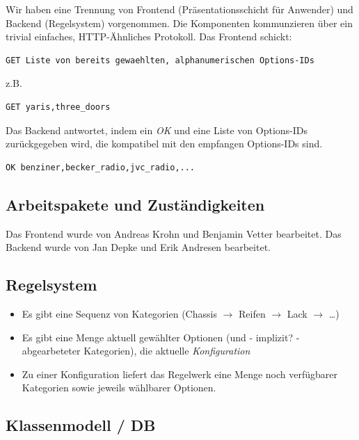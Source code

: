 \documentclass[a4paper,10pt]{article}
\begin{document}
Wir haben eine Trennung von Frontend (Präsentationsschicht für Anwender) und Backend (Regelsystem) vorgenommen.
Die Komponenten kommunzieren über ein trivial einfaches, HTTP-Ähnliches Protokoll.
Das Frontend schickt:

\begin{lstlisting}
GET Liste von bereits gewaehlten, alphanumerischen Options-IDs
\end{lstlisting}

z.B.

\begin{lstlisting}
GET yaris,three_doors
\end{lstlisting}

Das Backend antwortet, indem ein \textit{OK} und eine Liste von Options-IDs zurückgegeben wird, die kompatibel mit den empfangen Options-IDs sind.

\begin{lstlisting}
OK benziner,becker_radio,jvc_radio,...
\end{lstlisting}

\subsection*{Arbeitspakete und Zuständigkeiten}

Das Frontend wurde von Andreas Krohn und Benjamin Vetter bearbeitet.
Das Backend wurde von Jan Depke und Erik Andresen bearbeitet.
 
\subsection*{Regelsystem}

\begin{itemize}
 \item Es gibt eine Sequenz von Kategorien (Chassis $\rightarrow$ Reifen $\rightarrow$ Lack $\rightarrow$ \ldots)
 \item Es gibt eine Menge aktuell gewählter Optionen (und - implizit? - abgearbeteter Kategorien), die aktuelle \emph{Konfiguration}
 \item Zu einer Konfiguration liefert das Regelwerk eine Menge noch verfügbarer Kategorien sowie jeweils wählbarer Optionen.
\end{itemize}

\subsection*{Klassenmodell / DB}
\end{document}

